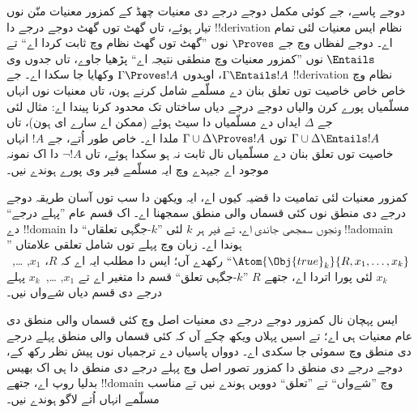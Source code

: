 \documentclass[../../../include/open-logic-section]{subfiles}
\begin{document}
دوجے پاسے، جے کوئی مکمل
دوجے درجے دی معنیات چھڈ
کے کمزور معنیات منّن نوں
تیار ہوئے، تاں گھٹ توں
گھٹ دوجے درجے دا
!!{derivation} نظام ایس
معنیات لئی تمام اے۔
دوجے لفظاں وچ جے
$\Proves$ نوں ”گھٹ توں گھٹ
نظام وچ ثابت کردا اے“
تے $\Entails$ نوں
”کمزور معنیات وچ منطقی
نتیجہ اے“ پڑھیا جاوے،
تاں جدوں وی
$\Gamma \Entails !A$،
اوہدوں
$\Gamma \Proves !A$
وکھایا جا سکدا اے۔ جے
!!{derivation} نظام وچ
خاص خاص خاصیت توں تعلق
بنان دے مسلّمے شامل
کرنے ہون، تاں معنیات
نوں انہاں مسلّمیاں پورے
کرن والیاں دوجے درجے
دیاں ساختاں تک محدود
کرنا پیندا اے: مثال
لئی جے $\Delta$ ایداں
دے مسلّمیاں دا سیٹ
ہوئے (ممکن اے سارے
ای ہون)، تاں
$\Gamma
\cup \Delta \Entails !A$
توں
$\Gamma \cup \Delta \Proves !A$
ملدا اے۔ خاص طور
اُتے، جے $!A$ انہاں
خاصیت توں تعلق بنان
دے مسلّمیاں نال
ثابت نہ ہو سکدا
ہوئے، تاں
$\lnot !A$ دا اک
نمونہ موجود اے
جیہدے وچ ایہ
مسلّمے فیر وی
پورے ہوندے نیں۔

کمزور معنیات لئی
تمامیت دا قضیہ
کیوں اے، ایہ ویکھن
دا سب توں آسان
طریقہ دوجے درجے
دی منطق نوں کئی
قسماں والی منطق
سمجھنا اے۔ اک قسم
عام ”پہلے درجے“
دے !!{domain}
ونجوں سمجھی جاندی
اے، تے فیر ہر $k$
لئی ”$k$-جگہی
تعلقاں“ دا
!!a{domain}
ہوندا اے۔ زبان
وچ پہلے توں
شامل تعلقی
علامتاں
”$\Atom{\Obj{true}_k}{R,x_1,\dots,x_k}$“
رکھدے آں؛ ایس
دا مطلب ایہ
اے کہ $R$،
$x_1$, \dots,~$x_k$
لئی پورا
اتردا اے،
جتھے $R$
”$k$-جگہی تعلق“
قسم دا متغیر
اے تے
$x_1$, \dots,~$x_k$
پہلے درجے
دی قسم دیاں
شےواں نیں۔

ایس پہچان
نال کمزور
دوجے درجے
دی معنیات
اصل وچ کئی
قسماں والی
منطق دی عام
معنیات ہی
اے؛ تے اسیں
پہلاں ویکھ
چکے آں کہ
کئی قسماں
والی منطق
پہلے درجے
دی منطق وچ
سموئی جا
سکدی اے۔
دوواں پاسیاں
دے ترجمیاں
نوں پیش نظر
رکھ کے، دوجے
درجے دی منطق
دا کمزور تصور
اصل وچ پہلے
درجے دی منطق
دا ہی اک
بھیس بدلیا
روپ اے،
جتھے
!!{domain}
وچ ”شےواں“
تے ”تعلق“
دوویں ہوندے
نیں تے مناسب
مسلّمے انہاں
اُتے لاگو
ہوندے نیں۔
\end{document}

